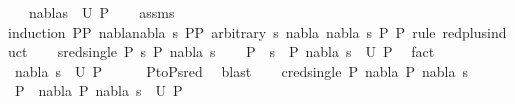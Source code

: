\begin{isabellebody}
\ \ \ {\isachardoublequoteopen}{\isacharparenleft}{\kern0pt}nabla{}{\isacharcomma}{\kern0pt}s{}{\isacharparenright}{\kern0pt}\ {\isasymin}\ U\ P{}{\isachardoublequoteclose}\isanewline
%
\isadelimproof
\ \ %
\endisadelimproof
%
\isatagproof
{}\isamarkupfalse%
\ assms\isanewline
{}\isamarkupfalse%
{\isacharparenleft}{\kern0pt}induction\ P{}{\isasymequiv}{\isachardoublequoteopen}P{}{\isachardoublequoteclose}\ nabla{\isasymequiv}{\isachardoublequoteopen}{\isacharparenleft}{\kern0pt}nabla{\isacharcomma}{\kern0pt}\ s{\isacharparenright}{\kern0pt}{\isachardoublequoteclose}\ P{}{\isasymequiv}{\isachardoublequoteopen}P{}{\isachardoublequoteclose}\ arbitrary{\isacharcolon}{\kern0pt}\ s\ nabla{}\ nabla\ s{}\ P{}\ P{}\ rule{\isacharcolon}{\kern0pt}\ red{\isacharunderscore}{\kern0pt}plus{\isachardot}{\kern0pt}induct{\isacharparenright}{\kern0pt}\isanewline
\ \ \isamarkupfalse%
\ {\isacharparenleft}{\kern0pt}sred{\isacharunderscore}{\kern0pt}single\ P{}\ s\ P{}\ nabla{}\ s{}{\isacharparenright}{\kern0pt}\isanewline
\ \ \isamarkupfalse%
\ {\isachardoublequoteopen}P{}\ {\isasymturnstile}\ s\ {\isasymleadsto}\ P{}{\isachardoublequoteclose}\ {\isachardoublequoteopen}{\isacharparenleft}{\kern0pt}nabla{}{\isacharcomma}{\kern0pt}\ s{}{\isacharparenright}{\kern0pt}\ {\isasymin}\ U\ P{}{\isachardoublequoteclose}\ \isamarkupfalse%
\ fact{\isacharplus}{\kern0pt}\isanewline
\ \ \isamarkupfalse%
\ \isamarkupfalse%
\ {\isachardoublequoteopen}{\isacharparenleft}{\kern0pt}nabla{}{\isacharcomma}{\kern0pt}\ s{}{\isacharparenright}{\kern0pt}\ {\isasymin}\ U\ P{}{\isachardoublequoteclose}\isanewline
\ \ \ \ \isamarkupfalse%
\ P{}{\isacharunderscore}{\kern0pt}to{\isacharunderscore}{\kern0pt}P{}{\isacharunderscore}{\kern0pt}sred\ \isamarkupfalse%
\ blast\isanewline
{}\isamarkupfalse%
\isanewline
\ \ \isamarkupfalse%
\ {\isacharparenleft}{\kern0pt}cred{\isacharunderscore}{\kern0pt}single\ P{}\ nabla{}\ P{}\ nabla{}\ s{}{\isacharparenright}{\kern0pt}\isanewline
\ \ \isamarkupfalse%
\ {\isachardoublequoteopen}P{}\ {\isasymturnstile}\ nabla{}\ {\isasymrightarrow}P{}{\isachardoublequoteclose}\ {\isachardoublequoteopen}{\isacharparenleft}{\kern0pt}nabla{}{\isacharcomma}{\kern0pt}\ s{}{\isacharparenright}{\kern0pt}\ {\isasymin}\ U\ P{}{\isachardoublequoteclose}\ \isamarkupfalse%

\end{isabellebody}
